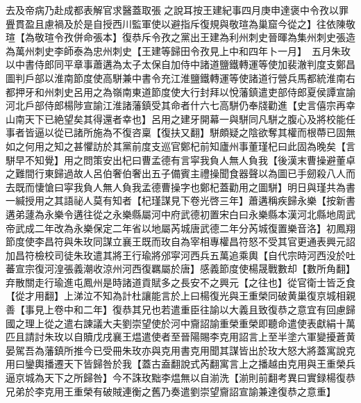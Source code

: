 去及帝病乃赴成都表解官求醫蓋取張之說耳按王建紀事四月庚申達褒中令孜以罪舋貫盈且慮禍及於是自授西川監軍使以避指斥復規與敬瑄為巢窟今從之】往依陳敬瑄【為敬瑄令孜併命張本】復恭斥令孜之黨出王建為利州刺史晉暉為集州刺史張造為萬州刺史李師泰為忠州刺史【王建等歸田令孜見上中和四年卜一月】　五月朱玫以中書侍郎同平章事蕭遘為太子太保自加侍中諸道鹽鐵轉運等使加裴澈判度支鄭昌圖判戶部以淮南節度使高駢兼中書令充江淮鹽鐵轉運等使諸道行營兵馬都統淮南右都押牙和州刺史呂用之為嶺南東道節度使大行封拜以悅藩鎮遣吏部侍郎夏侯譚宣諭河北戶部侍郎楊陟宣諭江淮諸藩鎮受其命者什六七高駢仍奉牋勸進【史言僖宗再幸山南天下已絶望矣其得還者幸也】呂用之建牙開幕一與駢同凡駢之腹心及將校能任事者皆逼以從已諸所施為不復咨稟【復扶又翻】駢頗疑之陰欲奪其權而根蔕已固無如之何用之知之甚懼訪於其黨前度支巡官鄭杞前知廬州事董瑾杞曰此固為晚矣【言駢早不知覺】用之問策安出杞曰曹孟德有言寜我負人無人負我【後漢末曹操避董卓之難間行東歸過故人呂伯奢伯奢出五子備賓主禮操聞食器聲以為圖已手劒殺八人而去既而悽愴曰寜我負人無人負我孟德曹操字也鄭杞蓋勸用之圖駢】明日與瑾共為書一緘授用之其語祕人莫有知者【杞瑾謀見下卷光啓三年】蕭遘稱疾歸永樂【按新書遘弟蘧為永樂令遘往從之永樂縣屬河中府武德初置宋白曰永樂縣本漢河北縣地周武帝武成二年改為永樂保定二年省以地屬芮城唐武德二年分芮城復置樂音洛】初鳳翔節度使李昌符與朱玫同謀立襄王既而玫自為宰相專權昌符怒不受其官更通表興元詔加昌符檢校司徒朱玫遣其將王行瑜將邠寜河西兵五萬追乘輿【自代宗時河西没於吐蕃宣宗復河湟張義潮收涼州河西復羈屬於唐】感義節度使楊晟戰數却【數所角翻】弃散關走行瑜進屯鳳州是時諸道貢賦多之長安不之興元【之往也】從官衛士皆乏食【從才用翻】上涕泣不知為計杜讓能言於上曰楊復光與王重榮同破黄巢復京城相親善【事見上卷中和二年】復恭其兄也若遣重臣往諭以大義且致復恭之意宜有回慮歸國之理上從之遣右諫議大夫劉崇望使於河中齎詔諭重榮重榮即聽命遣使表獻絹十萬匹且請討朱玫以自贖戊戌襄王煴遣使者至晉陽賜李克用詔言上至半塗六軍變擾蒼黄晏駕吾為藩鎮所推今已受冊朱玫亦與克用書克用聞其謀皆出於玫大怒大將蓋寓說克用曰鑾輿播遷天下皆歸咎於我【蓋古盍翻說式芮翻寓言上之播越由克用與王重榮兵逼京城為天下之所歸咎】今不誅玫黜李煴無以自湔洗【湔則前翻考異曰實録楊復恭兄弟於李克用王重榮有破賊連衡之舊乃奏遣劉崇望齎詔宣諭兼達復恭之意重】

